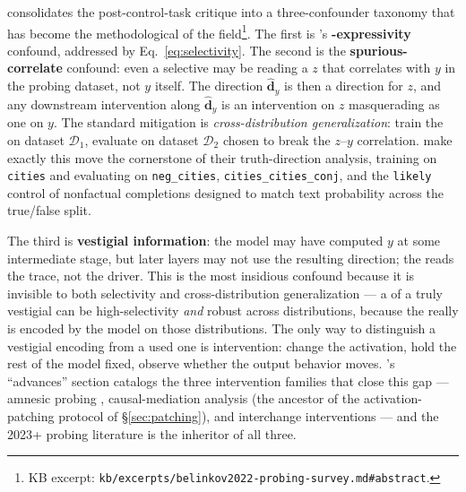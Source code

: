 \citet{belinkov2022-probing-survey} consolidates the post-control-task
critique into a three-confounder taxonomy that has become the
methodological  of the
field\footnote{KB excerpt: \texttt{kb/excerpts/belinkov2022-probing-survey.md\#abstract}.}.
The first is \citet{hewitt2019-control-tasks}'s
\textbf{-expressivity} confound, addressed by Eq.~\eqref{eq:selectivity}.
The second is the \textbf{spurious-correlate} confound: even a
selective  may be reading a  $z$ that correlates with
$y$ in the probing dataset, not $y$ itself. The  direction
$\hat{\mathbf{d}}_y$ is then a direction for $z$, and any downstream
intervention along $\hat{\mathbf{d}}_y$ is an intervention on $z$
masquerading as one on $y$. The standard mitigation is
\emph{cross-distribution generalization}: train the  on dataset
$\mathcal{D}_1$, evaluate on dataset $\mathcal{D}_2$ chosen to break
the $z$--$y$ correlation. \citet[\S 1, \S 4]{marks-tegmark-2023-truth}
make exactly this move the cornerstone of their truth-direction
analysis, training on \texttt{cities} and evaluating on
\texttt{neg\_cities}, \texttt{cities\_cities\_conj}, and the
\texttt{likely} control of nonfactual completions designed to match
text probability across the true/false split.

The third is \textbf{vestigial information}: the model may have
computed $y$ at some intermediate stage, but later layers may not use
the resulting direction; the  reads the trace, not the driver.
This is the most insidious confound because it is invisible to both
selectivity and cross-distribution generalization --- a  of a
truly vestigial  can be high-selectivity \emph{and} robust
across distributions, because the  really is encoded by the
model on those distributions. The only way to distinguish a vestigial
encoding from a used one is intervention: change the activation,
hold the rest of the model fixed, observe whether the output behavior
moves. \citet{belinkov2022-probing-survey}'s ``advances'' section
catalogs the three intervention families that close this gap ---
amnesic probing \citep[Elazar et al.\ 2021, surveyed in
][]{belinkov2022-probing-survey}, causal-mediation analysis (the
ancestor of the activation-patching protocol of
\S\ref{sec:patching}), and interchange interventions --- and the
2023+ probing literature is the inheritor of all three.

